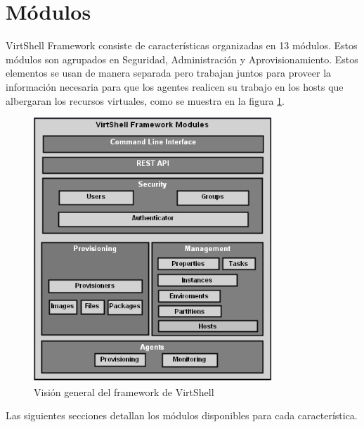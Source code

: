 \begin{description}
\end{description}

\section{Módulos}
VirtShell Framework consiste de características organizadas en 13 módulos. Estos módulos son agrupados en Seguridad, Administración y Aprovisionamiento. Estos elementos se usan de manera separada pero trabajan juntos para proveer la información necesaria para que los agentes realicen su trabajo en los hosts que albergaran los recursos virtuales, como se muestra en la figura \ref{fig:framework}. \\

\begin{figure}[h]
    \centering
	\caption{Visión general del framework de VirtShell}
	\label{fig:framework}
	\includegraphics[width = 0.8\textwidth]{../architecture/v1/diagrams/framework}
\end{figure}

Las siguientes secciones detallan los módulos disponibles para cada característica. 


